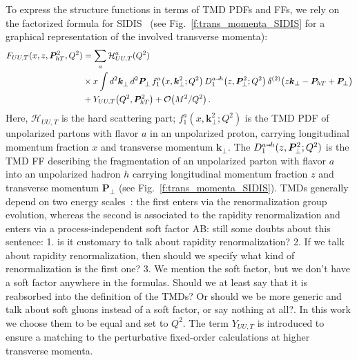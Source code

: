 \documentclass[aps,preprintnumbers,showpacs,nofootinbib,superscriptaddress,floatfix]{revtex4}
\newcommand{\AS}[1]{{\textcolor[rgb]{1,0,1}{#1}}}
\newcommand{\smarrow}{\mbox{\raisebox{-4.5pt}[0pt][0pt]{$\hspace{-1pt} 
		\vec{\phantom{v}}$}}}
\newcommand{\T}{\perp}
\newcommand{\Tperp}{T}
\begin{document}
To express the structure functions in terms of TMD PDFs and FFs, 
we rely on the factorized formula 
for SIDIS~\cite{Collins:1981uk,Collins:1984kg,Ji:2002aa,Ji:2004wu,%
Collins:2011zzd,Aybat:2011zv,GarciaEchevarria:2011rb,Echevarria:2012pw,%
Collins:2012uy} (see Fig.~\ref{f:trans_momenta_SIDIS} for a graphical
representation of the involved transverse momenta):  
\begin{align}
\label{e:SIDISkT}
   F_{UU,T}(x,z, \bm{P}_{h \Tperp}^2, Q^2) &= \sum_a \mathcal{H}_{UU,T}^{a}(Q^2) \\ 
      &\times x \int d^2\bm{k}_\T^{} \, d^2\bm{P}_\T^{} \,  f_1^a\big(x,\bm{k}_{\T}^2; Q^2 \big) \, D_{1}^{a\smarrow h}\big(z,\bm{P}_{\T}^2; Q^2 \big) \,
      \delta^{(2)} \big(z {\bm k}_{\T} - {\bm P}_{h \Tperp} + {\bm P}_{\T}\big)
\nonumber\\&
\nonumber + Y_{UU,T}\big(Q^2, \bm{P}_{h\Tperp}^2\big) + \mathcal{O}\big(M^2/Q^2\big) \, .
\end{align} 
Here, $\mathcal{H}_{UU,T}$ is the hard scattering part; $f_1^a(x,\bm{k}_{\T}^2;Q^2)$ is the TMD PDF of unpolarized partons with flavor $a$ in an unpolarized
proton, carrying longitudinal momentum fraction $x$ and transverse momentum
$\bm{k}_\T$.  The $D_1^{a\smarrow h}(z, \bm{P}_{\T}^2;Q^2)$ is the TMD FF describing the fragmentation of an unpolarized parton with flavor $a$ into
an unpolarized hadron $h$ carrying longitudinal momentum fraction $z$ and
transverse momentum 
$\bm{P}_\T$ (see Fig.~\ref{f:trans_momenta_SIDIS}).  
TMDs generally depend on two energy scales~\cite{Collins:2011zzd}: the first
enters via the renormalization group evolution, whereas the second is
associated to the rapidity renormalization and enters via a
process-independent soft factor \AS{AB: still some doubts about this sentence:
  1. is it customary to talk about rapidity renormalization? 2. If we talk
  about rapidity renormalization, then should we specify what kind of
  renormalization is the first one? 3. We mention the soft factor, but we
  don't have a soft factor anywhere in the formulas. Should we at least say
  that it is reabsorbed into the definition of the TMDs? Or should we be more
  generic and talk about soft gluons instead of a soft factor, or say nothing at all?}.  
In this work we choose them to be equal and set to $Q^2$. 
The term $Y_{UU,T}$ is introduced to ensure a matching
to the perturbative fixed-order calculations at higher transverse momenta. 
\end{document}
